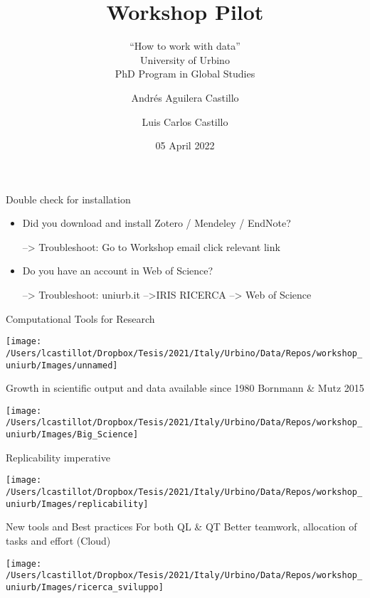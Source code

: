\documentclass[
  ignorenonframetext,
]{beamer}
\title{Workshop Pilot}
\subtitle{``How to work with data''\\
University of Urbino\\
PhD Program in Global Studies}
\author{Andrés Aguilera Castillo \and Luis Carlos Castillo}
\date{05 April 2022}
\begin{document}
\frame{\titlepage}

\begin{frame}{Double check for installation}
\protect\hypertarget{double-check-for-installation}{}
\begin{itemize}
\item
  Did you download and install Zotero / Mendeley / EndNote?

  --\textgreater{} Troubleshoot: Go to Workshop email click relevant
  link
\item
  Do you have an account in Web of Science?

  --\textgreater{} Troubleshoot: uniurb.it --\textgreater IRIS RICERCA
  --\textgreater{} Web of Science
\end{itemize}
\end{frame}

\begin{frame}{Computational Tools for Research}
\protect\hypertarget{computational-tools-for-research}{}
\begin{center}\texttt{[image: /Users/lcastillot/Dropbox/Tesis/2021/Italy/Urbino/Data/Repos/workshop\_uniurb/Images/unnamed]} \end{center}
\end{frame}

\begin{frame}{Growth in scientific output and data available since 1980}
\protect\hypertarget{growth-in-scientific-output-and-data-available-since-1980}{}
Bornmann \& Mutz 2015

\begin{center}\texttt{[image: /Users/lcastillot/Dropbox/Tesis/2021/Italy/Urbino/Data/Repos/workshop\_uniurb/Images/Big\_Science]} \end{center}
\end{frame}

\begin{frame}{Replicability imperative}
\protect\hypertarget{replicability-imperative}{}
\begin{center}\texttt{[image: /Users/lcastillot/Dropbox/Tesis/2021/Italy/Urbino/Data/Repos/workshop\_uniurb/Images/replicability]} \end{center}
\end{frame}

\begin{frame}{New tools and Best practices}
\protect\hypertarget{new-tools-and-best-practices}{}
For both QL \& QT Better teamwork, allocation of tasks and effort
(Cloud)

\begin{center}\texttt{[image: /Users/lcastillot/Dropbox/Tesis/2021/Italy/Urbino/Data/Repos/workshop\_uniurb/Images/ricerca\_sviluppo]} \end{center}
\end{frame}
\end{document}
